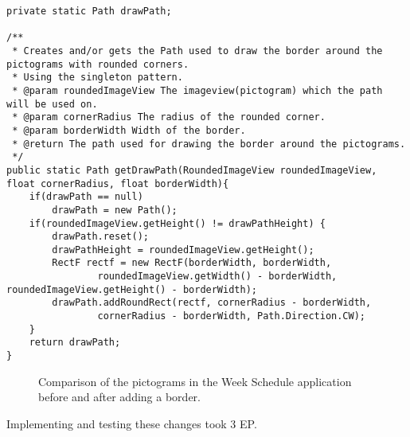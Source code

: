 \begin{lstlisting}[float, floatplacement=h, caption={One of the singletons used to solve this task.}, label={lst:singleton_example}] 
private static Path drawPath;

/**
 * Creates and/or gets the Path used to draw the border around the pictograms with rounded corners.
 * Using the singleton pattern.
 * @param roundedImageView The imageview(pictogram) which the path will be used on.
 * @param cornerRadius The radius of the rounded corner.
 * @param borderWidth Width of the border.
 * @return The path used for drawing the border around the pictograms.
 */
public static Path getDrawPath(RoundedImageView roundedImageView, float cornerRadius, float borderWidth){
    if(drawPath == null)
        drawPath = new Path();
    if(roundedImageView.getHeight() != drawPathHeight) {
        drawPath.reset();
        drawPathHeight = roundedImageView.getHeight();
        RectF rectf = new RectF(borderWidth, borderWidth,
                roundedImageView.getWidth() - borderWidth, roundedImageView.getHeight() - borderWidth);
        drawPath.addRoundRect(rectf, cornerRadius - borderWidth,
                cornerRadius - borderWidth, Path.Direction.CW);
    }
    return drawPath;
}
\end{lstlisting} 

\begin{figure}[h]
    \centering
    \caption{Comparison of the pictograms in the Week Schedule application before and after adding a border.}
    \label{fig:before-after-borders}
\end{figure}

Implementing and testing these changes took 3 EP. 
